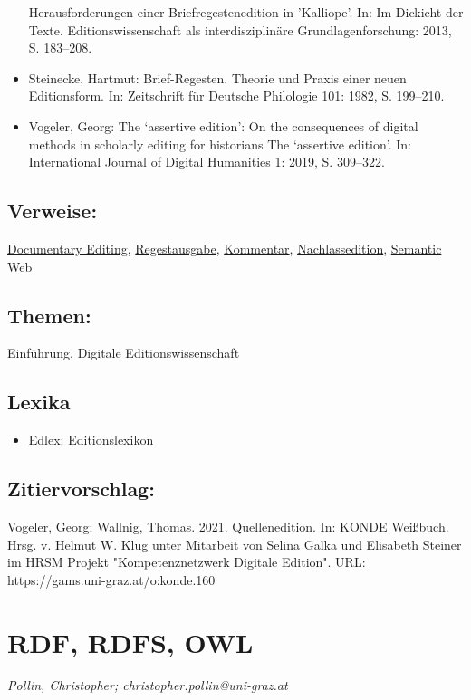 \documentclass{article}
\begin{document}
\begin{itemize}
                              Herausforderungen einer Briefregestenedition in 'Kalliope'. In: Im Dickicht der Texte. Editionswissenschaft als
                              interdisziplinäre Grundlagenforschung: 2013, S. 183–208.\item Steinecke, Hartmut: Brief-Regesten. Theorie und Praxis einer neuen
                              Editionsform. In: Zeitschrift für Deutsche Philologie 101: 1982, S. 199–210.\item Vogeler, Georg: The ‘assertive edition’: On the consequences of digital
                              methods in scholarly editing for historians The ‘assertive edition’. In: International Journal of Digital Humanities 1: 2019, S. 309–322.\end{itemize}\subsection*{Verweise:}\href{https://gams.uni-graz.at/o:konde.72}{Documentary Editing}, \href{https://gams.uni-graz.at/o:konde.162}{Regestausgabe}, \href{https://gams.uni-graz.at/o:konde.34}{Kommentar}, \href{https://gams.uni-graz.at/o:konde.140}{Nachlassedition}, \href{https://gams.uni-graz.at/o:konde.167}{Semantic Web}\subsection*{Themen:}Einführung, Digitale Editionswissenschaft\subsection*{Lexika}\begin{itemize}\item \href{https://edlex.de/index.php?title=Quellenedition}{Edlex: Editionslexikon}\end{itemize}\subsection*{Zitiervorschlag:}Vogeler, Georg; Wallnig, Thomas. 2021. Quellenedition. In: KONDE Weißbuch. Hrsg. v. Helmut W. Klug unter Mitarbeit von Selina Galka und Elisabeth Steiner im HRSM Projekt "Kompetenznetzwerk Digitale Edition". URL: https://gams.uni-graz.at/o:konde.160\newpage\section*{RDF, RDFS, OWL} \emph{Pollin, Christopher; christopher.pollin@uni-graz.at }\\
        
\end{document}
